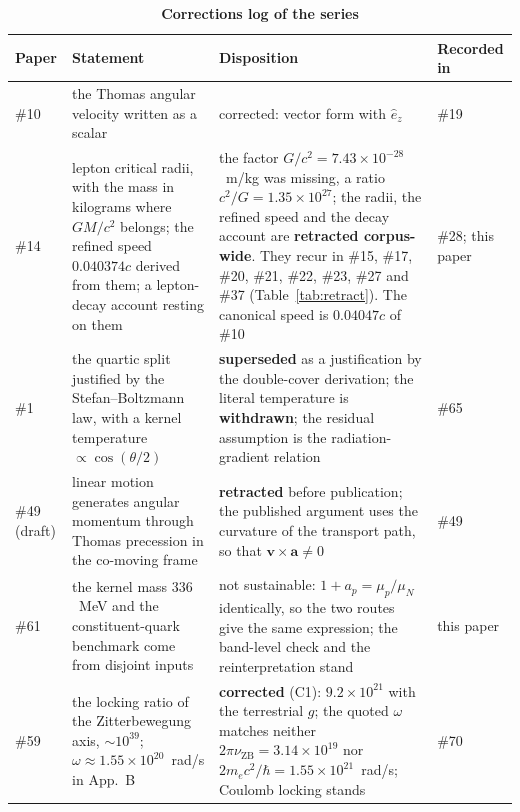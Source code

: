 \documentclass[%
 reprint, amsmath,amssymb, aps, prb, ]{revtex4-2}
\numberwithin{equation}{section}
\newcommand{\nuZB}{\nu_{\text{ZB}}}
\begin{document}
\begin{table}[p]
\centering
\caption{\textbf{Corrections log of the series}}
\label{tab:corrections}
\renewcommand{\arraystretch}{1.32}
\setlength{\tabcolsep}{6pt}
\begin{tabular}{>{\raggedright\arraybackslash}p{1.5cm}>{\raggedright\arraybackslash}p{5.5cm}>{\raggedright\arraybackslash}p{7.3cm}>{\raggedright\arraybackslash}p{1.8cm}}
\toprule
\textbf{Paper} & \textbf{Statement} & \textbf{Disposition} & \textbf{Recorded in} \\
\midrule
\#10 & the Thomas angular velocity written as a scalar & corrected: vector form with $\hat e_z$ & \#19 \\
\addlinespace[0.12cm]
\#14 & lepton critical radii, with the mass in kilograms where $GM/c^{2}$ belongs; the refined speed $0.040374c$ derived from them; a lepton-decay account resting on them & the factor $G/c^{2} = 7.43\times10^{-28}$~m/kg was missing, a ratio $c^{2}/G = 1.35\times10^{27}$; the radii, the refined speed and the decay account are \textbf{retracted corpus-wide}. They recur in \#15, \#17, \#20, \#21, \#22, \#23, \#27 and \#37 (Table~\ref{tab:retract}). The canonical speed is $0.04047c$ of \#10 & \#28; this paper \\
\addlinespace[0.12cm]
\#1 & the quartic split justified by the Stefan--Boltzmann law, with a kernel temperature $\propto\cos(\theta/2)$ & \textbf{superseded} as a justification by the double-cover derivation; the literal temperature is \textbf{withdrawn}; the residual assumption is the radiation-gradient relation & \#65 \\
\addlinespace[0.12cm]
\#49 (draft) & linear motion generates angular momentum through Thomas precession in the co-moving frame & \textbf{retracted} before publication; the published argument uses the curvature of the transport path, so that $\mathbf v\times\mathbf a\neq0$ & \#49 \\
\addlinespace[0.12cm]
\#61 & the kernel mass $336$~MeV and the constituent-quark benchmark come from disjoint inputs & not sustainable: $1+a_p = \mu_p/\mu_N$ identically, so the two routes give the same expression; the band-level check and the reinterpretation stand & this paper \\
\addlinespace[0.12cm]
\#59 & the locking ratio of the Zitterbewegung axis, $\sim10^{39}$; $\omega\approx1.55\times10^{20}$~rad/s in App.~B & \textbf{corrected} (C1): $9.2\times10^{21}$ with the terrestrial $g$; the quoted $\omega$ matches neither $2\pi\nuZB = 3.14\times10^{19}$ nor $2m_ec^{2}/\hbar = 1.55\times10^{21}$~rad/s; Coulomb locking stands & \#70 \\

\end{tabular}
\end{table}
\end{document}
